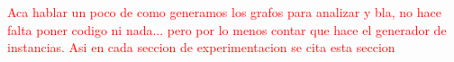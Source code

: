 \documentclass[a4paper]{article}
\begin{document}
\textcolor{red}{Aca hablar un poco de como generamos los grafos para analizar y bla, no hace falta poner codigo ni nada... pero por lo menos contar que hace el generador de instancias. Asi en cada seccion de experimentacion se cita esta seccion}












\end{document}
